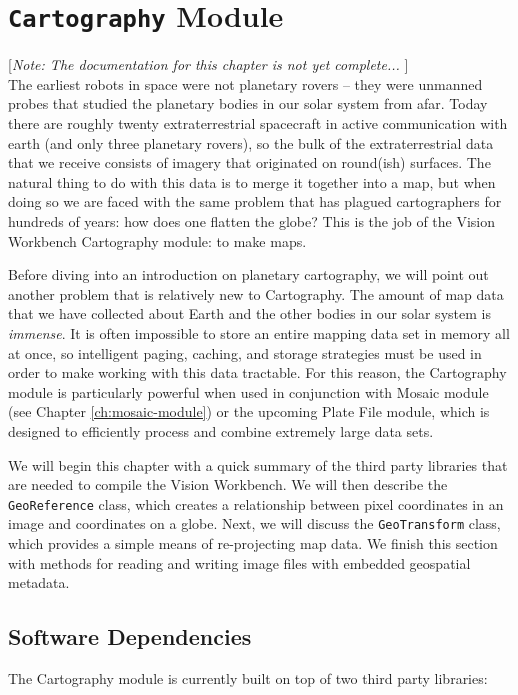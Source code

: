 \chapter{{\tt Cartography} Module}\label{ch:cartography-module}

[{\em Note: The documentation for this chapter is not yet complete... }]
$$
$$ 
The earliest robots in space were not planetary rovers -- they were
unmanned probes that studied the planetary bodies in our solar system
from afar.  Today there are roughly twenty extraterrestrial spacecraft
in active communication with earth (and only three planetary rovers), so
the bulk of the extraterrestrial data that we receive consists of
imagery that originated on round(ish) surfaces.  The natural thing to
do with this data is to merge it together into a map, but when doing
so we are faced with the same problem that has plagued cartographers
for hundreds of years: how does one flatten the globe?  This is the job
of the Vision Workbench Cartography module: to make maps.

Before diving into an introduction on planetary cartography, we will
point out another problem that is relatively new to Cartography.  The
amount of map data that we have collected about Earth and the other
bodies in our solar system is {\em immense}.  It is often impossible
to store an entire mapping data set in memory all at once, so
intelligent paging, caching, and storage strategies must be used in
order to make working with this data tractable.  For this reason, the
Cartography module is particularly powerful when used in conjunction
with Mosaic module (see Chapter \ref{ch:mosaic-module}) or the
upcoming Plate File module, which is designed to efficiently process
and combine extremely large data sets.

We will begin this chapter with a quick summary of the third party
libraries that are needed to compile the Vision Workbench.  We will
then describe the \verb#GeoReference# class, which creates a
relationship between pixel coordinates in an image and coordinates on
a globe.  Next, we will discuss the \verb#GeoTransform# class, which
provides a simple means of re-projecting map data.  We finish this
section with methods for reading and writing image files with embedded
geospatial metadata.

\section{Software Dependencies}

The Cartography module is currently built on top of two third party
libraries:

